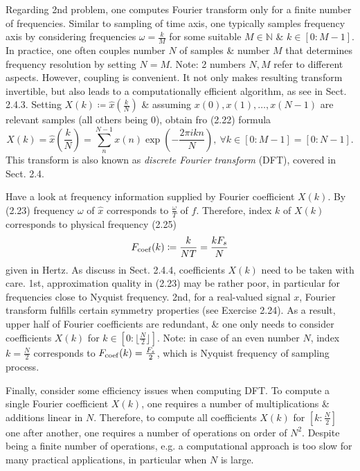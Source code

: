 \documentclass{article}
\begin{document}
\begin{itemize}
\begin{itemize}
\begin{itemize}
			Regarding 2nd problem, one computes Fourier transform only for a finite number of frequencies. Similar to sampling of time axis, one typically samples frequency axis by considering frequencies $\omega = \frac{k}{M}$ for some suitable $M\in\mathbb{N}$ \& $k\in[0:M-1]$. In practice, one often couples number $N$ of samples \& number $M$ that determines frequency resolution by setting $N = M$. Note: 2 numbers $N,M$ refer to different aspects. However, coupling is convenient. It not only makes resulting transform invertible, but also leads to a computationally efficient algorithm, as see in Sect. 2.4.3. Setting $X(k)\coloneqq\hat{x}(\frac{k}{N})$ \& assuming $x(0),x(1),\ldots,x(N - 1)$ are relevant samples (all others being 0), obtain fro (2.22) formula
			\begin{equation*}
				X(k) = \hat{x}\left(\frac{k}{N}\right) = \sum_{n}^{N-1} x(n)\exp\left(-\frac{2\pi ikn}{N}\right),\ \forall k\in[0:M - 1] = [0:N-1].
			\end{equation*}
			This transform is also known as {\it discrete Fourier transform} (DFT), covered in Sect. 2.4.
			
			Have a look at frequency information supplied by Fourier coefficient $X(k)$. By (2.23) frequency $\omega$ of $\hat{x}$ corresponds to $\frac{\omega}{T}$ of $\hat{f}$. Therefore, index $k$ of $X(k)$ corresponds to physical frequency (2.25)
			\begin{equation*}
				F_{\rm coef}(k)\coloneqq\frac{k}{NT} = \frac{kF_s}{N}
			\end{equation*}
			given in Hertz. As discuss in Sect. 2.4.4, coefficients $X(k)$ need to be taken with care. 1st, approximation quality in (2.23) may be rather poor, in particular for frequencies close to Nyquist frequency. 2nd, for a real-valued signal $x$, Fourier transform fulfills certain symmetry properties (see Exercise 2.24). As a result, upper half of Fourier coefficients are redundant, \& one only needs to consider coefficients $X(k)$ for $k\in[0:\lfloor\frac{N}{2}\rfloor]$. Note: in case of an even number $N$, index $k = \frac{N}{2}$ corresponds to $F_{\rm coef}(k) = \frac{F_s}{2}$, which is Nyquist frequency of sampling process.
			
			Finally, consider some efficiency issues when computing DFT. To compute a single Fourier coefficient $X(k)$, one requires a number of multiplications \& additions linear in $N$. Therefore, to compute all coefficients $X(k)$ for $[k:\frac{N}{2}]$ one after another, one requires a number of operations on order of $N^2$. Despite being a finite number of operations, e.g. a computational approach is too slow for many practical applications, in particular when $N$ is large.
			

\end{itemize}
\end{itemize}
\end{itemize}
\end{document}
